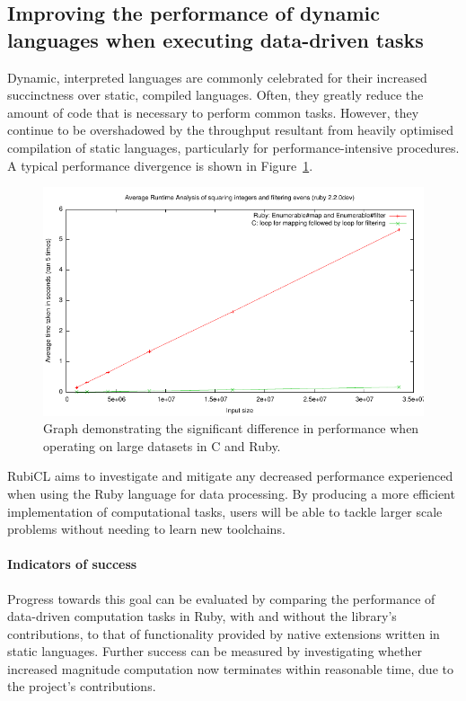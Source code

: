 \subsection{Improving the performance of dynamic languages when executing data-driven tasks}
Dynamic, interpreted languages are commonly celebrated for their increased succinctness over static, compiled languages. Often, they greatly reduce the amount of code that is necessary to perform common tasks. However, they continue to be overshadowed by the throughput resultant from heavily optimised compilation of static languages, particularly for performance-intensive procedures. A typical performance divergence is shown in Figure~\ref{fig:ruby_vs_c}.

\begin{figure}[h]
  \includegraphics[width=\textwidth]{./figures/ruby_vs_c.pdf}
  \caption{Graph demonstrating the significant difference in performance when operating on large datasets in C and Ruby.}
  \label{fig:ruby_vs_c}
\end{figure}

RubiCL aims to investigate and mitigate any decreased performance experienced when using the Ruby language for data processing. By producing a more efficient implementation of computational tasks, users will be able to tackle larger scale problems without needing to learn new toolchains.

\paragraph*{Indicators of success}
Progress towards this goal can be evaluated by comparing the performance of data-driven computation tasks in Ruby, with and without the library's contributions, to that of functionality provided by native extensions written in static languages. Further success can be measured by investigating whether increased magnitude computation now terminates within reasonable time, due to the project's contributions.


